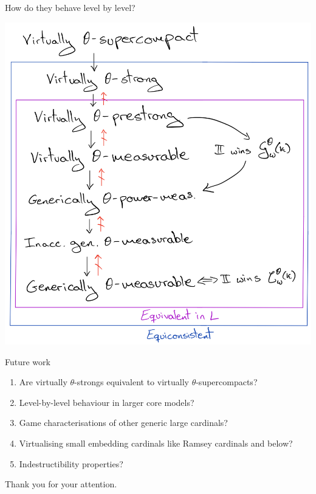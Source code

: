 \documentclass{beamer}
\begin{document}
\begin{frame}{How do they behave level by level?}
  \begin{center}
    \includegraphics[scale=.16]{gfx/lbl_virtual.jpg}
  \end{center}
\end{frame}

\begin{frame}{Future work}
  \begin{enumerate}
    \item Are virtually $\theta$-strongs equivalent to virtually $\theta$-supercompacts?
    \pause\item Level-by-level behaviour in larger core models?
    \pause\item Game characterisations of other generic large cardinals?
    \pause\item Virtualising small embedding cardinals like Ramsey cardinals and below?
    \pause\item Indestructibility properties?
  \end{enumerate}
\end{frame}

\begin{frame}{}
  \begin{center}
    {\Large Thank you for your attention.}
  \end{center}
\end{frame}
\end{document}
